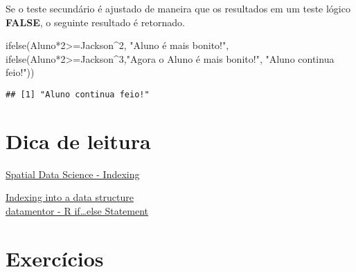 \documentclass[
]{book}
\newenvironment{Shaded}{\begin{snugshade}}{\end{snugshade}}
\newcommand{\DecValTok}[1]{\textcolor[rgb]{0.00,0.00,0.81}{#1}}
\newcommand{\FunctionTok}[1]{\textcolor[rgb]{0.00,0.00,0.00}{#1}}
\newcommand{\NormalTok}[1]{#1}
\newcommand{\SpecialCharTok}[1]{\textcolor[rgb]{0.00,0.00,0.00}{#1}}
\newcommand{\StringTok}[1]{\textcolor[rgb]{0.31,0.60,0.02}{#1}}
\begin{document}
Se o teste secundário é ajustado de maneira que os resultados em um teste lógico \textbf{FALSE}, o seguinte resultado é retornado.

\begin{Shaded}
\begin{Highlighting}[]
\FunctionTok{ifelse}\NormalTok{(Aluno}\SpecialCharTok{*}\DecValTok{2}\SpecialCharTok{\textgreater{}=}\NormalTok{Jackson}\SpecialCharTok{\^{}}\DecValTok{2}\NormalTok{, }\StringTok{"Aluno é mais bonito!"}\NormalTok{,}
       \FunctionTok{ifelse}\NormalTok{(Aluno}\SpecialCharTok{*}\DecValTok{2}\SpecialCharTok{\textgreater{}=}\NormalTok{Jackson}\SpecialCharTok{\^{}}\DecValTok{3}\NormalTok{,}\StringTok{"Agora o Aluno é mais bonito!"}\NormalTok{, }\StringTok{"Aluno continua feio!"}\NormalTok{))}
\end{Highlighting}
\end{Shaded}

\begin{verbatim}
## [1] "Aluno continua feio!"
\end{verbatim}

\hypertarget{dica-de-leitura}{%
\section{Dica de leitura}\label{dica-de-leitura}}

\href{https://rspatial.org/intr/4-indexing.html}{Spatial Data Science - Indexing}

\href{http://www.cookbook-r.com/Basics/Indexing_into_a_data_structure/}{Indexing into a data structure}\\
\href{https://www.datamentor.io/r-programming/if-else-statement/}{datamentor - R if\ldots else Statement}

\hypertarget{exercuxedcios}{%
\section{Exercícios}\label{exercuxedcios}}
\end{document}

